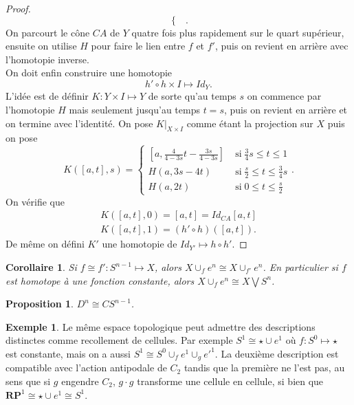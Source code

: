 \documentclass[12pt]{book}
\newtheorem{cor}[lemma]{Corollaire}
\newtheorem{prop}[lemma]{Proposition}
\theoremstyle{definition}
\newtheorem{example}[lemma]{Exemple}
\theoremstyle{remark}
\begin{document}
\begin{proof}
\[\begin{cases}
			\end{cases}
		.\] 
		On parcourt le cône $CA$ de $Y$ quatre fois plus rapidement sur le quart supérieur, ensuite on utilise $H$ pour faire le lien entre $f$ et $f'$, puis on revient en arrière avec l'homotopie inverse. \\
		On doit enfin construire une homotopie \[
			h'\circ h \times I \longmapsto Id_{Y}
		.\] 
		L'idée est de définir $K : Y \times I \longmapsto Y$ de sorte qu'au temps $s$ on commence par l'homotopie $H$ mais seulement jusqu'au temps $t=s$, puis on revient en arrière et on termine avec l'identité.
		On pose $K|_{X\times I}$ comme étant la projection sur $X$ puis on pose  \[
			K([a,t],s) = \begin{cases}
				[a, \frac{4}{4-3s}t-\frac{3s}{4-3s}] \; &\text{si} \; \frac{3}{4}s \le t \le 1 \\
				H(a,3s-4t) \; &\text{si} \; \frac{s}{2} \le t \le \frac{3}{4}s \\
				H(a,2t) \; &\text{si} \; 0 \le t \le \frac{s}{2}
			\end{cases}
		.\] 
		On vérifie que 
		\begin{align*}
			K([a,t],0) = [a,t] = Id_{CA}[a,t] \\
			K([a,t],1) = (h'\circ h)([a,t])
		.\end{align*}
		De même on défini $K'$ une homotopie de  $Id_{Y'} \longmapsto h \circ h'$.
	\end{proof}
	\begin{cor}
		Si $f \cong f' : S^{n-1} \longmapsto X$, alors $X \cup_f e^n \cong X \cup_{f'}e^n$. En particulier si $f$ est homotope à une fonction constante, alors $X \cup_f e^n \cong X \bigvee S^n$.
	\end{cor}
	\begin{prop}
		$D^n \cong CS^{n-1}$.
	\end{prop}
	\begin{example}
		Le même espace topologique peut admettre des descriptions distinctes comme recollement de cellules. Par exemple $S^1 \cong \star \cup e^1$ où  $f : S^0 \longmapsto \star$ est constante, mais on a aussi $S^1 \cong S^0 \cup_f e^1 \cup_g e'^1$. La deuxième description est compatible avec l'action antipodale de $C_2$ tandis que la première ne l'est pas, au sens que si $g$ engendre  $C_2$,  $g \cdot g$ transforme une cellule en cellule, si bien que $\mathbf{RP}^1 \cong \star \cup e^1 \cong S^1$.
	\end{example}
\end{document}
